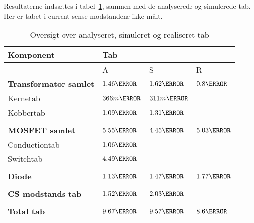 Resultaterne indsættes i tabel~\ref{tab:realisering_tab}, sammen med de analyserede og simulerede tab. Her er tabet i current-sense modstandene ikke målt.
\begin{table}[H] 			
	\centering
	\begin{tabularx}{\textwidth}{|X|l|l|l|}
		\hline
		\textbf{\large Komponent} & \multicolumn{3}{|l|}{\textbf{\large Tab}} \\ \hline
		& A & S	& R\\ \hline
		\textbf{Transformator samlet} & $1.46\watt$ & $1.62\watt$ & $0.8\watt$\\ \hline 
		Kernetab & $366m\watt$ & $311m\watt$ &  \\ \hline
		Kobbertab & $1.09\watt$ & $1.31\watt$ & \\ \hline
		& &	& \\ \hline
		\textbf{MOSFET samlet} & $5.55\watt$ & $4.45\watt$ & $5.03\watt$\\ \hline
		Conductiontab & $1.06\watt$ & & \\ \hline
		Switchtab & $4.49\watt$ &  &    \\ \hline
		& &	& \\ \hline
		\textbf{Diode} & $1.13\watt$ & $1.47\watt$ & $1.77\watt$\\ \hline
		& &	& \\ \hline
		\textbf{CS modstands tab} & $1.52\watt$ & $2.03\watt$ & \\ \hline
		& &	& \\ \hline
		\textbf{Total tab} & $9.67\watt$ & $9.57\watt$ & $8.6\watt$\\ \hline
	\end{tabularx}
	\caption{Oversigt over analyseret, simuleret og realiseret tab}
	\label{tab:realisering_tab}
\end{table}





